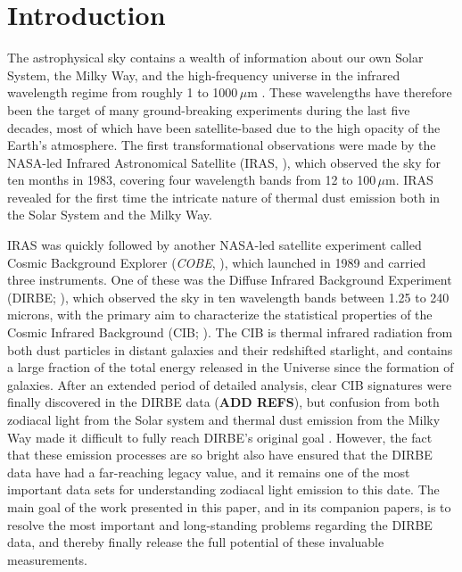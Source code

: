 \documentclass{aa}
\def\COBE{\textit{COBE}}
\begin{document}

   \maketitle

\setcounter{tocdepth}{2}
\tableofcontents
   
\section{Introduction}


The astrophysical sky contains a wealth of information about our own Solar System, the Milky Way, and the high-frequency universe in the infrared wavelength regime from roughly 1 to 1000\,$\mu$m \citep[e.g.,][]{johnson:1966,soifer:1987,gardner:2006}. These wavelengths have therefore been the target of many ground-breaking experiments during the last five decades, most of which have been satellite-based due to the high opacity of the Earth's atmosphere. The first transformational observations were made by the NASA-led Infrared Astronomical Satellite (IRAS, \citealt{neugebauer:1984}), which observed the sky for ten months in 1983, covering four wavelength bands from 12 to 100$\,\mu$m. IRAS revealed for the first time the intricate nature of thermal dust emission both in the Solar System and the Milky Way.

IRAS was quickly followed by another NASA-led satellite experiment called Cosmic Background Explorer (\COBE, \citealt{boggess92}), which launched in 1989 and carried three instruments. One of these was the Diffuse Infrared Background Experiment (DIRBE; \citealp{hauser1998}), which observed the sky in ten wavelength bands between 1.25 to 240 microns, with the primary aim to characterize the statistical properties of the Cosmic Infrared Background (CIB; \citealp{partridge1967}). The CIB is thermal infrared radiation from both dust particles in distant galaxies and their redshifted starlight, and contains a large fraction of the total energy released in the Universe since the formation of galaxies. After an extended period of detailed analysis, clear CIB signatures were finally discovered in the DIRBE data ({\bf ADD REFS}), but confusion from both zodiacal light from the Solar system and thermal dust emission from the Milky Way made it difficult to fully reach DIRBE's original goal \citep{arendt1998,hauser1998,kelsall1998}. However, the fact that these emission processes are so bright also have ensured that the DIRBE data have had a far-reaching legacy value, and it remains one of the most important data sets for understanding zodiacal light emission to this date. The main goal of the work presented in this paper, and in its companion papers, is to resolve the most important and long-standing problems regarding the DIRBE data, and thereby finally release the full potential of these invaluable measurements.
\end{document}
